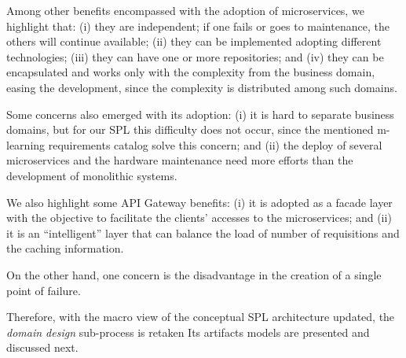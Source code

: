 Among other benefits encompassed with the adoption of microservices, we highlight that: (i) they are independent; if one fails or goes to maintenance, the others will continue available; (ii) they can be implemented adopting different technologies; (iii) they can have one or more repositories; and (iv) they can be encapsulated and works only with the complexity from the business domain, easing the development, since the complexity is distributed among such domains.

Some concerns also emerged with its adoption: (i) it is hard to separate business domains, but for our SPL this difficulty does not occur, since the mentioned m-learning requirements catalog solve this concern; and (ii) the deploy of several microservices and the hardware maintenance need more efforts than the development of monolithic systems.


We also highlight some API Gateway benefits: (i) it is adopted as a facade layer with the objective to facilitate the clients' accesses to the microservices; and
(ii) it is an ``intelligent'' layer that can balance the load of number of requisitions and the caching information.
 
On the other hand, one concern is the disadvantage in the creation of a single point of failure.



Therefore, with the macro view of the conceptual SPL architecture updated, the \textit{domain design} sub-process is retaken Its artifacts models are presented and discussed next.

